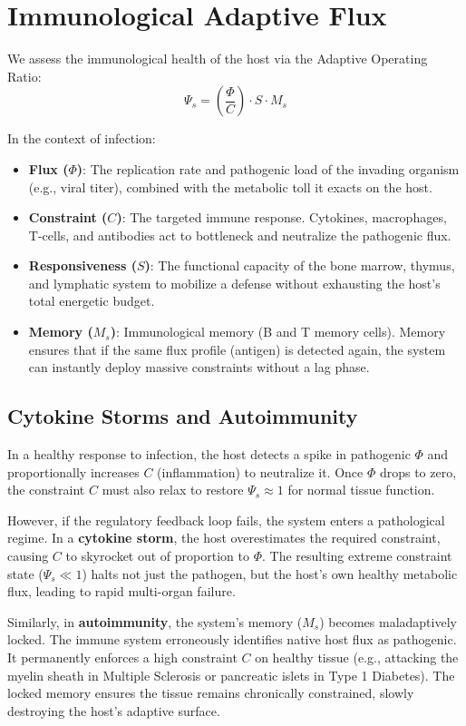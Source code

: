 \documentclass[11pt,a4paper]{article}
\begin{document}
\section{Immunological Adaptive Flux}
We assess the immunological health of the host via the Adaptive Operating Ratio:
\begin{equation}
    \Psi_s = \left( \frac{\Phi}{C} \right) \cdot S \cdot M_s
\end{equation}

In the context of infection:
\begin{itemize}
    \item \textbf{Flux ($\Phi$)}: The replication rate and pathogenic load of the invading organism (e.g., viral titer), combined with the metabolic toll it exacts on the host.
    \item \textbf{Constraint ($C$)}: The targeted immune response. Cytokines, macrophages, T-cells, and antibodies act to bottleneck and neutralize the pathogenic flux.
    \item \textbf{Responsiveness ($S$)}: The functional capacity of the bone marrow, thymus, and lymphatic system to mobilize a defense without exhausting the host's total energetic budget.
    \item \textbf{Memory ($M_s$)}: Immunological memory (B and T memory cells). Memory ensures that if the same flux profile (antigen) is detected again, the system can instantly deploy massive constraints without a lag phase.
\end{itemize}

\subsection{Cytokine Storms and Autoimmunity}
In a healthy response to infection, the host detects a spike in pathogenic $\Phi$ and proportionally increases $C$ (inflammation) to neutralize it. Once $\Phi$ drops to zero, the constraint $C$ must also relax to restore $\Psi_s \approx 1$ for normal tissue function.

However, if the regulatory feedback loop fails, the system enters a pathological regime. In a \textbf{cytokine storm}, the host overestimates the required constraint, causing $C$ to skyrocket out of proportion to $\Phi$. The resulting extreme constraint state ($\Psi_s \ll 1$) halts not just the pathogen, but the host's own healthy metabolic flux, leading to rapid multi-organ failure.

Similarly, in \textbf{autoimmunity}, the system's memory ($M_s$) becomes maladaptively locked. The immune system erroneously identifies native host flux as pathogenic. It permanently enforces a high constraint $C$ on healthy tissue (e.g., attacking the myelin sheath in Multiple Sclerosis or pancreatic islets in Type 1 Diabetes). The locked memory ensures the tissue remains chronically constrained, slowly destroying the host's adaptive surface.
\end{document}
